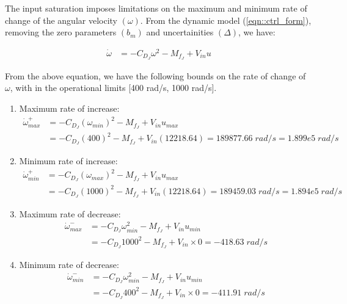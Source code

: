 The input saturation imposes limitations on the maximum and minimum rate of
change of the angular velocity $(\omega)$. From the dynamic model (\ref{eqn::ctrl_form}), removing the zero parameters
$(b_m)$ and uncertainities $(\Delta)$, we have:

\begin{align*}
    \dot \omega &= -C_{D_J} \omega^2 - M_{f_J} + V_{in} u
\end{align*}

From the above equation, we have the following bounds on the rate of change of
$\omega$, with in the operational limits [400 rad/s, 1000 rad/s].

\begin{enumerate}
    \item Maximum rate of increase:
    \begin{align*}
        \dot \omega^{+}_{max} &= -C_{D_J} (\omega_{min})^2 - M_{f_J}+ V_{in} u_{max}\\
                              &= -C_{D_J} (400)^2 - M_{f_J} + V_{in} (12218.64)
                               =  189877.66 \; rad/s
                               = 1.899e5 \; rad/s
    \end{align*}

    \item Minimum rate of increase:
    \begin{align*}
        \dot \omega^{+}_{min} &= -C_{D_J} (\omega_{max})^2 - M_{f_J}+ V_{in} u_{max}\\
                              &= -C_{D_J} (1000)^2 - M_{f_J} + V_{in} (12218.64)
                               = 189459.03 \; rad/s = 1.894e5 \; rad/s
    \end{align*}

    \item Maximum rate of decrease:
    \begin{align*}
        \dot \omega^{-}_{max} &= -C_{D_J} \omega_{min}^2 - M_{f_J} + V_{in} u_{min}\\
                              &= -C_{D_J} 1000^2 - M_{f_J} + V_{in} \times 0
                               = -418.63 \; rad/s
    \end{align*}

    \item Minimum rate of decrease:
    \begin{align*}
        \dot \omega^{-}_{min} &= -C_{D_J} \omega_{min}^2 - M_{f_J} + V_{in} u_{min}\\
                              &= -C_{D_J} 400^2 - M_{f_J} + V_{in} \times 0  = -411.91 \; rad/s
    \end{align*}
\end{enumerate}

